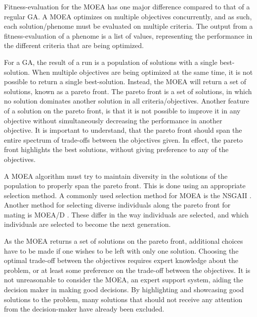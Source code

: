 \documentclass[10pt,a4paper]{book}
\begin{document}
Fitness-evaluation for the \gls{MOEA} has one major difference compared to that of a regular \gls{GA}. A \gls{MOEA} optimizes on multiple objectives concurrently, and as such, each solution/phenome must be evaluated on multiple criteria. The output from a fitness-evaluation of a phenome is a list of values, representing the performance in the different criteria that are being optimized. 

For a \gls{GA}, the result of a run is a population of solutions with a single best-solution. When multiple objectives are being optimized at the same time, it is not possible to return a single best-solution. Instead, the \gls{MOEA} will return a set of solutions, known as a pareto front. The pareto front is a set of solutions, in which no solution dominates another solution in all criteria/objectives. Another feature of a solution on the pareto front, is that it is not possible to improve it in any objective without simultaneously decreasing the performance in another objective. It is important to understand, that the pareto front should span the entire spectrum of trade-offs between the objectives given. In effect, the pareto front highlights the best solutions, without giving preference to any of the objectives.

A \gls{MOEA} algorithm must try to maintain diversity in the solutions of the population to properly span the pareto front. This is done using an appropriate selection method. A commonly used selection method for \gls{MOEA} is the NSGAII \cite{deb2002fast}. Another method for selecting diverse individuals along the pareto front for mating is MOEA/D  \cite{zhang2007moea}. These differ in the way individuals are selected, and which individuals are selected to become the next generation.

As the \gls{MOEA} returns a set of solutions on the pareto front, additional choices have to be made if one wishes to be left with only one solution. Choosing the optimal trade-off between the objectives requires expert knowledge about the problem, or at least some preference on the trade-off between the objectives. It is not unreasonable to consider the \gls{MOEA}, an expert support system, aiding the decision maker in making good decisions. By highlighting and showcasing good solutions to the problem, many solutions that should not receive any attention from the decision-maker have already been excluded.






\newpage
\end{document}
